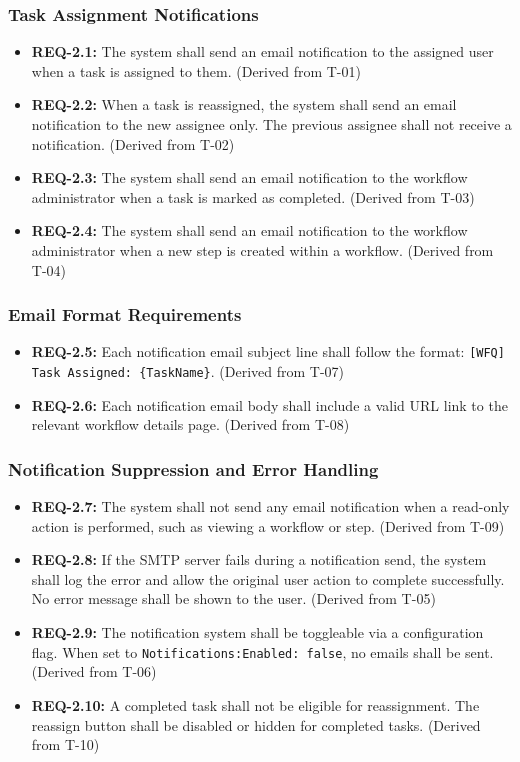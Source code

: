 \documentclass[12pt]{article}
\begin{document}
\subsubsection{Task Assignment Notifications}
\begin{itemize}
    \item \textbf{REQ-2.1:} The system shall send an email notification to the assigned
    user when a task is assigned to them. (Derived from T-01)
    \item \textbf{REQ-2.2:} When a task is reassigned, the system shall send an email
    notification to the new assignee only. The previous assignee shall not receive a
    notification. (Derived from T-02)
    \item \textbf{REQ-2.3:} The system shall send an email notification to the workflow
    administrator when a task is marked as completed. (Derived from T-03)
    \item \textbf{REQ-2.4:} The system shall send an email notification to the workflow
    administrator when a new step is created within a workflow. (Derived from T-04)
\end{itemize}
 
\subsubsection{Email Format Requirements}
\begin{itemize}
    \item \textbf{REQ-2.5:} Each notification email subject line shall follow the format:
    \texttt{[WFQ] Task Assigned: \{TaskName\}}. (Derived from T-07)
    \item \textbf{REQ-2.6:} Each notification email body shall include a valid URL link
    to the relevant workflow details page. (Derived from T-08)
\end{itemize}
 
\subsubsection{Notification Suppression and Error Handling}
\begin{itemize}
    \item \textbf{REQ-2.7:} The system shall not send any email notification when a
    read-only action is performed, such as viewing a workflow or step. (Derived from T-09)
    \item \textbf{REQ-2.8:} If the SMTP server fails during a notification send, the system
    shall log the error and allow the original user action to complete successfully. No
    error message shall be shown to the user. (Derived from T-05)
    \item \textbf{REQ-2.9:} The notification system shall be toggleable via a configuration
    flag. When set to \texttt{Notifications:Enabled: false}, no emails shall be sent.
    (Derived from T-06)
    \item \textbf{REQ-2.10:} A completed task shall not be eligible for reassignment. The
    reassign button shall be disabled or hidden for completed tasks. (Derived from T-10)
\end{itemize}
 
\end{document}
